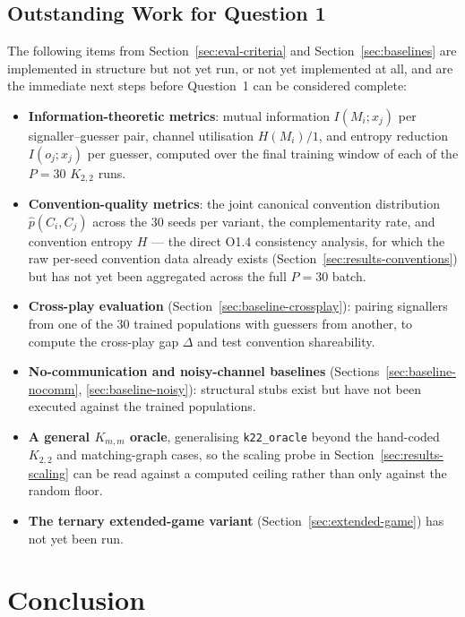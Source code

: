 \documentclass[a4paper,twoside,12pt]{report}
\begin{document}
\section{Outstanding Work for Question 1}
\label{sec:q1-outstanding}

The following items from Section~\ref{sec:eval-criteria} and
Section~\ref{sec:baselines} are implemented in structure but not yet run, or
not yet implemented at all, and are the immediate next steps before Question~1
can be considered complete:

\begin{itemize}
    \item \textbf{Information-theoretic metrics}: mutual information
    $I(M_i; x_j)$ per signaller--guesser pair, channel utilisation
    $H(M_i)/1$, and entropy reduction $I(o_j; x_j)$ per guesser, computed over
    the final training window of each of the $P=30$ $K_{2,2}$ runs.
    \item \textbf{Convention-quality metrics}: the joint canonical convention
    distribution $\hat{p}(C_i, C_j)$ across the 30 seeds per variant, the
    complementarity rate, and convention entropy $H$ --- the direct O1.4
    consistency analysis, for which the raw per-seed convention data already
    exists (Section~\ref{sec:results-conventions}) but has not yet been
    aggregated across the full $P=30$ batch.
    \item \textbf{Cross-play evaluation} (Section~\ref{sec:baseline-crossplay}):
    pairing signallers from one of the 30 trained populations with guessers
    from another, to compute the cross-play gap $\Delta$ and test convention
    shareability.
    \item \textbf{No-communication and noisy-channel baselines}
    (Sections~\ref{sec:baseline-nocomm}, \ref{sec:baseline-noisy}): structural
    stubs exist but have not been executed against the trained populations.
    \item \textbf{A general $K_{m,m}$ oracle}, generalising
    \texttt{k22\_oracle} beyond the hand-coded $K_{2,2}$ and matching-graph
    cases, so the scaling probe in Section~\ref{sec:results-scaling} can be
    read against a computed ceiling rather than only against the random floor.
    \item \textbf{The ternary extended-game variant} (Section~\ref{sec:extended-game})
    has not yet been run.
\end{itemize}
    
    
    
    
    \chapter{Conclusion}
    \label{chap:conclusion}
    
    
    \nocite{*}
    
    
\end{document}
